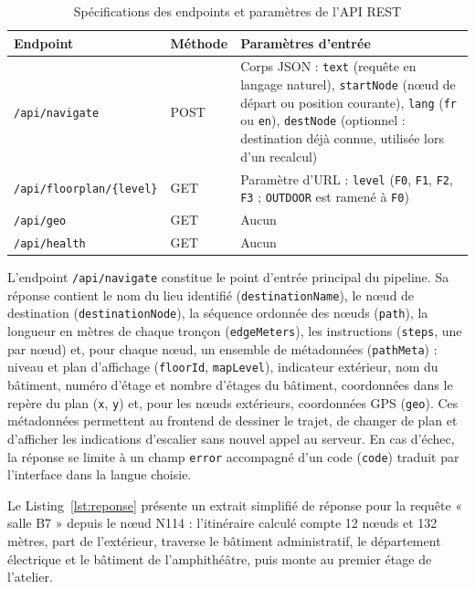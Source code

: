\documentclass[12pt,a4paper]{report}
\begin{document}
\begin{table}[h]
\centering
\caption{Spécifications des endpoints et paramètres de l'API REST}
\label{tab:api}
\small
\begin{tabularx}{\linewidth}{|p{4.2cm}|p{1.6cm}|X|}
\hline
\textbf{Endpoint} & \textbf{Méthode} & \textbf{Paramètres d'entrée}\\
\hline
\texttt{/api/navigate} & POST & Corps JSON : \texttt{text} (requête en langage naturel), \texttt{startNode} (nœud de départ ou position courante), \texttt{lang} (\texttt{fr} ou \texttt{en}), \texttt{destNode} (optionnel : destination déjà connue, utilisée lors d'un recalcul)\\
\hline
\texttt{/api/floorplan/\{level\}} & GET & Paramètre d'URL : \texttt{level} (\texttt{F0}, \texttt{F1}, \texttt{F2}, \texttt{F3} ; \texttt{OUTDOOR} est ramené à \texttt{F0})\\
\hline
\texttt{/api/geo} & GET & Aucun\\
\hline
\texttt{/api/health} & GET & Aucun\\
\hline
\end{tabularx}
\end{table}

L'endpoint \texttt{/api/navigate} constitue le point d'entrée principal du pipeline. Sa réponse
contient le nom du lieu identifié (\texttt{destinationName}), le nœud de destination
(\texttt{destinationNode}), la séquence ordonnée des nœuds (\texttt{path}), la longueur en mètres
de chaque tronçon (\texttt{edgeMeters}), les instructions (\texttt{steps}, une par nœud) et, pour
chaque nœud, un ensemble de métadonnées (\texttt{pathMeta}) : niveau et plan d'affichage
(\texttt{floorId}, \texttt{mapLevel}), indicateur extérieur, nom du bâtiment, numéro d'étage et
nombre d'étages du bâtiment, coordonnées dans le repère du plan (\texttt{x}, \texttt{y}) et, pour
les nœuds extérieurs, coordonnées GPS (\texttt{geo}). Ces métadonnées permettent au frontend de
dessiner le trajet, de changer de plan et d'afficher les indications d'escalier sans nouvel appel
au serveur. En cas d'échec, la réponse se limite à un champ \texttt{error} accompagné d'un code
(\texttt{code}) traduit par l'interface dans la langue choisie.

Le Listing~\ref{lst:reponse} présente un extrait simplifié de réponse pour la requête « salle B7 »
depuis le nœud N114 : l'itinéraire calculé compte 12 nœuds et 132 mètres, part de l'extérieur,
traverse le bâtiment administratif, le département électrique et le bâtiment de l'amphithéâtre,
puis monte au premier étage de l'atelier.
\end{document}
